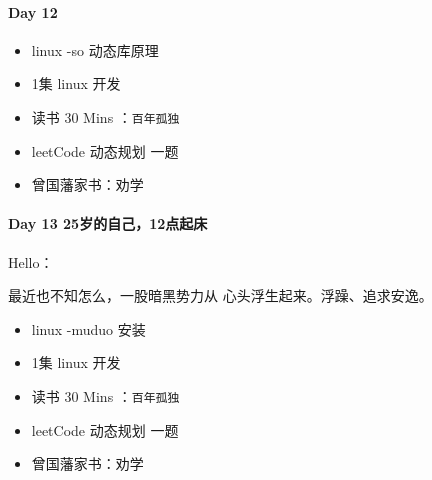 \documentclass[UTF8,a4paper,8pt]{ctexart}
\begin{document}
	\paragraph{Day 12      \quad     }
		 \begin{itemize}[itemindent = 1em]
		 	\renewcommand\labelitemi{\makebox[0pt][l]{$\square$}\raisebox{.15ex}{\hspace{0.1em}$\checkmark$}}		
		 	\item   linux -so 动态库原理
		 	\item   1集  linux  开发
		 	
		 	\renewcommand\labelitemi{\makebox[0pt][l]{$\square$}\hspace{1em}}
		 	\item   读书  30 Mins	：\verb|百年孤独|
		 	\item   leetCode 动态规划 一题
		 	
		 	
		 	\item  曾国藩家书：劝学
		 \end{itemize}
	\paragraph{Day 13  25岁的自己，12点起床    \quad     }
		Hello：
		
		最近也不知怎么，一股暗黑势力从 心头浮生起来。浮躁、追求安逸。
		\begin{itemize}[itemindent = 1em]
			\renewcommand\labelitemi{\makebox[0pt][l]{$\square$}\raisebox{.15ex}{\hspace{0.1em}$\checkmark$}}		
			\item   linux -muduo 安装
			\item   1集  linux  开发
			
			\renewcommand\labelitemi{\makebox[0pt][l]{$\square$}\hspace{1em}}
			\item   读书  30 Mins	：\verb|百年孤独|
			\item   leetCode 动态规划 一题
			
			
			\item  曾国藩家书：劝学
		\end{itemize}
\end{document}
